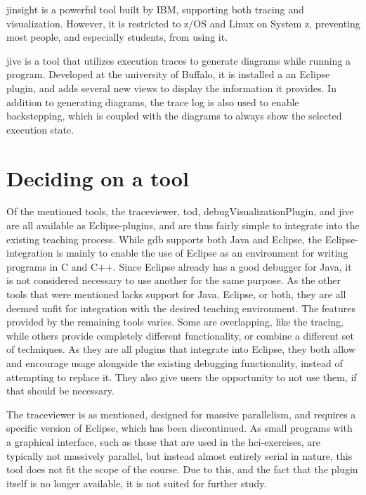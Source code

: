 \Gls{jinsight} \cite{Pauw} is a powerful tool built by IBM, supporting both tracing and visualization.
However, it is restricted to z/OS and Linux on System z, preventing most people, and especially students, from using it.

\gls{jive} is a tool that utilizes execution traces to generate diagrams while running a program.
Developed at the university of Buffalo, it is installed a an Eclipse plugin, and adds several new views to display the information it provides.
In addition to generating diagrams, the trace log is also used to enable backstepping, which is coupled with the diagrams to always show the selected execution state.

\section{Deciding on a tool}\label{preDiscuss}

Of the mentioned tools, the \gls{traceviewer}, \gls{tod}, \gls{debugVisualizationPlugin}, and \gls{jive} are all available as Eclipse-plugins, and are thus fairly simple to integrate into the existing teaching process.
While \gls{gdb} supports both Java and Eclipse, the Eclipse-integration is mainly to enable the use of Eclipse as an environment for writing programs in C and C++.
Since Eclipse already has a good debugger for Java, it is not considered necessary to use another for the same purpose.
As the other tools that were mentioned lacks support for Java, Eclipse, or both, they are all deemed unfit for integration with the desired teaching environment.
The features provided by the remaining tools varies.
Some are overlapping, like the tracing, while others provide completely different functionality, or combine a different set of techniques.
As they are all plugins that integrate into Eclipse, they both allow and encourage usage alongside the existing debugging functionality, instead of attempting to replace it.
They also give users the opportunity to not use them, if that should be necessary.

The \gls{traceviewer} is as mentioned, designed for massive parallelism, and requires a specific version of Eclipse, which has been discontinued.
As small programs with a graphical interface, such as those that are used in the \gls{hci}-exercises, are typically not massively parallel, but instead almost entirely serial in nature, this tool does not fit the scope of the course.
Due to this, and the fact that the plugin itself is no longer available, it is not suited for further study.

